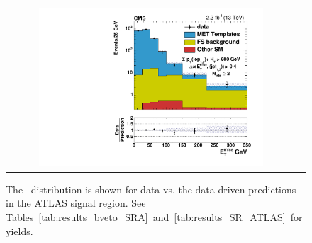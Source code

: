 \begin{table}[htb]
  \scriptsize
  \begin{center}
    \caption{\label{tab:results_SR_ATLAS} 
      Results are shown for the ATLAS signal region.
      Systematic uncertainties for each region are included in the total uncertainty. 
    }
  \end{center}
\end{table}


\begin{figure}[!ht]
\begin{center}
\begin{tabular}{cc}
\includegraphics[width=0.8\textwidth]{results/figs/h_met_rawgt1jet_ll_signalregion_rawMET_SR_ATLAS_fsbkg_passtrig.pdf} \\
\end{tabular}
\caption{The \MET\ distribution is shown for data vs. the data-driven predictions in the ATLAS signal region.
See Tables~\ref{tab:results_bveto_SRA}~and~\ref{tab:results_SR_ATLAS}~for yields.
\label{fig:results_SR_ATLAS}
}
\end{center}
\end{figure}

